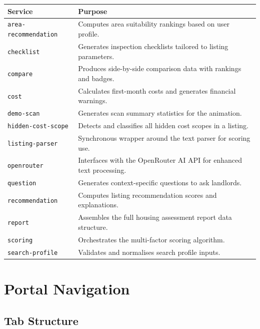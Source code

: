 \documentclass[12pt, a4paper, oneside]{report}
\begin{document}
\begin{longtable}{p{6cm} p{7cm}}
\toprule
\textbf{Service} & \textbf{Purpose} \\
\midrule
\endhead
\texttt{area-recommendation} & Computes area suitability rankings based on user profile. \\
\midrule
\texttt{checklist} & Generates inspection checklists tailored to listing parameters. \\
\midrule
\texttt{compare} & Produces side-by-side comparison data with rankings and badges. \\
\midrule
\texttt{cost} & Calculates first-month costs and generates financial warnings. \\
\midrule
\texttt{demo-scan} & Generates scan summary statistics for the animation. \\
\midrule
\texttt{hidden-cost-scope} & Detects and classifies all hidden cost scopes in a listing. \\
\midrule
\texttt{listing-parser} & Synchronous wrapper around the text parser for scoring use. \\
\midrule
\texttt{openrouter} & Interfaces with the OpenRouter AI API for enhanced text processing. \\
\midrule
\texttt{question} & Generates context-specific questions to ask landlords. \\
\midrule
\texttt{recommendation} & Computes listing recommendation scores and explanations. \\
\midrule
\texttt{report} & Assembles the full housing assessment report data structure. \\
\midrule
\texttt{scoring} & Orchestrates the multi-factor scoring algorithm. \\
\midrule
\texttt{search-profile} & Validates and normalises search profile inputs. \\
\bottomrule
\end{longtable}


\chapter{Portal Navigation}

\section{Tab Structure}
\end{document}
